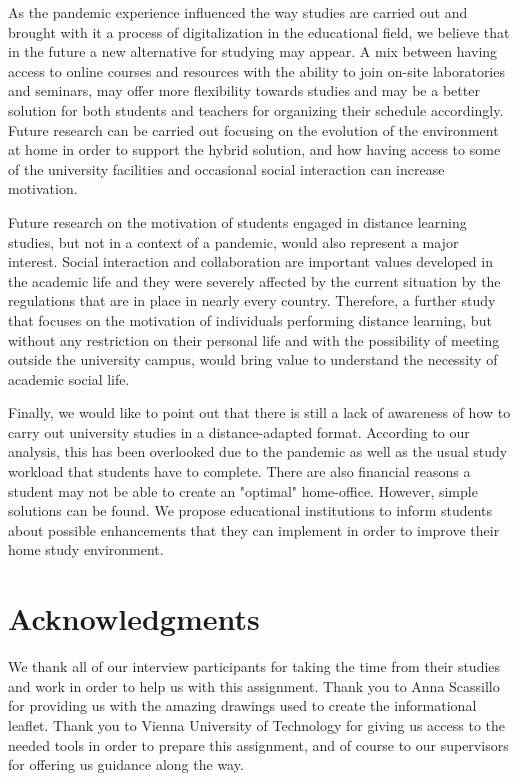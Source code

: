 \documentclass{sigchi}
\begin{document}
As the pandemic experience influenced the way studies are carried out and brought with it a process of digitalization in the educational field, we believe that in the future a new alternative for studying may appear. A mix between having access to online courses and resources with the ability to join on-site laboratories and seminars, may offer more flexibility towards studies and may be a better solution for both students and teachers for organizing their schedule accordingly. Future research can be carried out focusing on the evolution of the environment at home in order to support the hybrid solution, and how having access to some of the university facilities and occasional social interaction can increase motivation.

Future research on the motivation of students engaged in distance learning studies, but not in a context of a pandemic, would also represent a major interest. Social interaction and collaboration are important values developed in the academic life and they were severely affected by the current situation by the regulations that are in place in nearly every country. Therefore, a further study that focuses on the motivation of individuals performing distance learning, but without any restriction on their personal life and with the possibility of meeting outside the university campus, would bring value to understand the necessity of academic social life.

Finally, we would like to point out that there is still a lack of awareness of how to carry out university studies in a distance-adapted format. According to our analysis, this has been overlooked due to the pandemic as well as the usual study workload that students have to complete. There are also financial reasons a student may not be able to create an "optimal" home-office. However, simple solutions can be found. We propose educational institutions to inform students about possible enhancements that they can implement in order to improve their home study environment. 


\section{Acknowledgments}
We thank all of our interview participants for taking the time from their studies and work in order to help us with this assignment. Thank you to Anna Scassillo for providing us with the amazing drawings used to create the informational leaflet. Thank you to Vienna University of Technology for giving us access to the needed tools in order to prepare this assignment, and of course to our supervisors for offering us guidance along the way.



\end{document}
